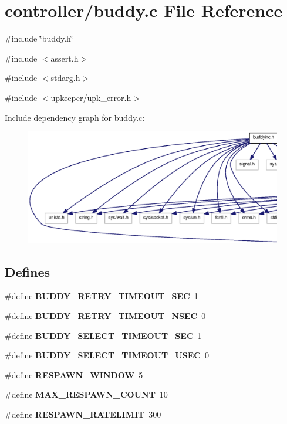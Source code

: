 \section{controller/buddy.c File Reference}
\label{buddy_8c}
{\ttfamily \#include \char`\"{}buddy.h\char`\"{}}\par
{\ttfamily \#include $<$assert.h$>$}\par
{\ttfamily \#include $<$stdarg.h$>$}\par
{\ttfamily \#include $<$upkeeper/upk\_\-error.h$>$}\par
Include dependency graph for buddy.c:\nopagebreak
\begin{figure}[H]
\begin{center}
\leavevmode
\includegraphics[width=400pt]{buddy_8c__incl}
\end{center}
\end{figure}
\subsection*{Defines}
\begin{DoxyCompactItemize}
\item 
\#define {\bf BUDDY\_\-RETRY\_\-TIMEOUT\_\-SEC}~1
\item 
\#define {\bf BUDDY\_\-RETRY\_\-TIMEOUT\_\-NSEC}~0
\item 
\#define {\bf BUDDY\_\-SELECT\_\-TIMEOUT\_\-SEC}~1
\item 
\#define {\bf BUDDY\_\-SELECT\_\-TIMEOUT\_\-USEC}~0
\item 
\#define {\bf RESPAWN\_\-WINDOW}~5
\item 
\#define {\bf MAX\_\-RESPAWN\_\-COUNT}~10
\item 
\#define {\bf RESPAWN\_\-RATELIMIT}~300
\end{DoxyCompactItemize}
